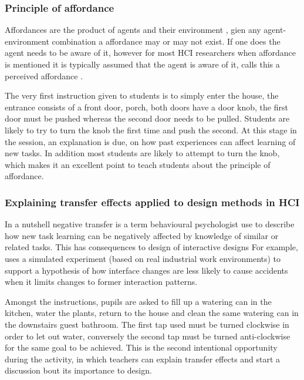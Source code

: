 \documentclass{sig-alternate}
\begin{document}
\subsubsection*{Principle of affordance}

Affordances are the product of agents and their environment
\cite{gibson1977theory}, gien any agent-environment combination a
affordance may or may not exist. If one does the agent needs to be
aware of it, however for most HCI researchers when affordance is
mentioned it is typically assumed that the agent is aware of it, calls
this a perceived affordance \cite{norman1999affordance}.

The very first instruction given to students is to simply enter the
house, the entrance consists of a front door, porch, both doors have a
door knob, the first door must be pushed whereas the second door needs
to be pulled. Students are likely to try to turn the knob the first
time and push the second. At this stage in the session, an explanation
is due, on how past experiences can affect learning of new tasks. In
addition most students are likely to attempt to turn the knob, which
makes it an excellent point to teach students about the principle of
affordance.


\subsubsection*{Explaining transfer effects applied to design methods
  in HCI}

In a nutshell negative transfer\cite{Lunchin, Pan2010, Woltz} is a
term behavioural psychologist use to describe how new task learning
can be negatively affected by knowledge of similar or related tasks.
This has consequences to design of interactive designs
\cite{waern1993varieties} For example,\cite{Besnard2005105} uses a
simulated experiment (based on real industrial work environments) to
support a hypothesis of how interface changes are less likely to cause
accidents when it limits changes to former interaction patterns.

Amongst the instructions, pupils are asked to fill up a watering can
in the kitchen, water the plants, return to the house and clean the
same watering can in the downstairs guest bathroom. The first tap used
must be turned clockwise in order to let out water, conversely the
second tap must be turned anti-clockwise for the same goal to be
achieved. This is the second intentional opportunity during the
activity, in which teachers can explain transfer effects and start a
discussion bout its importance to design.
\end{document}
